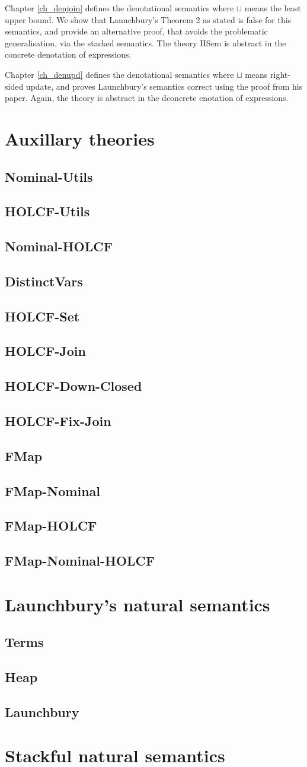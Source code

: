 \documentclass[11pt,a4paper,parskip=half]{scrbook}
\begin{document}
Chapter \ref{ch_denjoin} defines the denotational semantics where $\sqcup$ means the least upper bound. We show that Launchbury's Theorem 2 as stated is false for this semantics, and provide an alternative proof, that avoids the problematic generalisation, via the stacked semantics. The theory HSem is abstract in the concrete denotation of expressions.

Chapter \ref{ch_denupd} defines the denotational semantics where $\sqcup$ means right-sided update, and proves Launchbury's semantics correct using the proof from his paper. Again, the theory  is abstract in the dconcrete enotation of expressions.


\newcommand{\theory}[1]{\section{#1}\label{sec_#1}}

\chapter{Auxillary theories}
\label{ch_aux}

\theory{Nominal-Utils}

\theory{HOLCF-Utils}

\theory{Nominal-HOLCF}

\theory{DistinctVars}

\theory{HOLCF-Set}

\theory{HOLCF-Join}

\theory{HOLCF-Down-Closed}

\theory{HOLCF-Fix-Join}

\theory{FMap}

\theory{FMap-Nominal}

\theory{FMap-HOLCF}

\theory{FMap-Nominal-HOLCF}


\chapter{Launchbury's natural semantics}
\label{ch_natsem}

\theory{Terms}
\theory{Heap}

\theory{Launchbury}

\chapter{Stackful natural semantics}
\label{ch_natsemstack}
\end{document}
